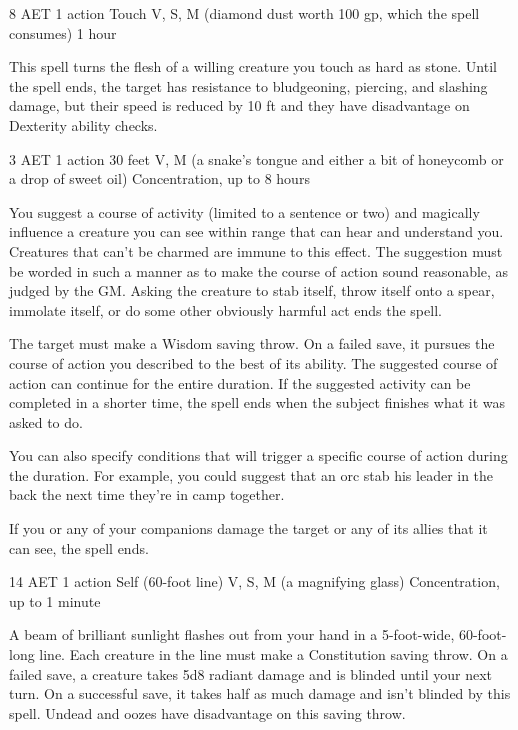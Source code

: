 {8 AET}
{1 action}
{Touch}
{V, S, M (diamond dust worth 100 gp, which the spell consumes)}
{1 hour}

This spell turns the flesh of a willing creature you touch as hard as stone. Until the spell ends, the target has resistance to bludgeoning, piercing, and slashing damage, but their speed is reduced by 10 ft and they have disadvantage on Dexterity ability checks.


{3 AET}
{1 action}
{30 feet}
{V, M (a snake's tongue and either a bit of honeycomb or a drop of sweet oil)}
{Concentration, up to 8 hours}

You suggest a course of activity (limited to a sentence or two) and magically influence a creature you can see within range that can hear and understand you. Creatures that can't be charmed are immune to this effect. The suggestion must be worded in such a manner as to make the course of action sound reasonable, as judged by the GM. Asking the creature to stab itself, throw itself onto a spear, immolate itself, or do some other obviously harmful act ends the spell.

The target must make a Wisdom saving throw. On a failed save, it pursues the course of action you described to the best of its ability. The suggested course of action can continue for the entire duration. If the suggested activity can be completed in a shorter time, the spell ends when the subject finishes what it was asked to do.

You can also specify conditions that will trigger a specific course of action during the duration. For example, you could suggest that an orc stab his leader in the back the next time they're in camp together.

If you or any of your companions damage the target or any of its allies that it can see, the spell ends.

{14 AET}
{1 action}
{Self (60-foot line)}
{V, S, M (a magnifying glass)}
{Concentration, up to 1 minute}

A beam of brilliant sunlight flashes out from your hand in a 5-foot-wide, 60-foot-long line. Each creature in the line must make a Constitution saving throw. On a failed save, a creature takes 5d8 radiant damage and is blinded until your next turn. On a successful save, it takes half as much damage and isn't blinded by this spell. Undead and oozes have disadvantage on this saving throw.

